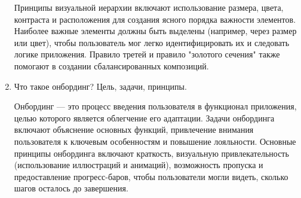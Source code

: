 \begin{enumerate}
    Принципы визуальной иерархии включают использование размера, цвета, контраста и расположения для создания ясного порядка важности элементов. Наиболее важные элементы должны быть выделены (например, через размер или цвет), чтобы пользователь мог легко идентифицировать их и следовать логике приложения. Правило третей и правило "золотого сечения" также помогают в создании сбалансированных композиций.

    \item Что такое онбординг? Цель, задачи, принципы.

    Онбординг — это процесс введения пользователя в функционал приложения, целью которого является облегчение его адаптации. Задачи онбординга включают объяснение основных функций, привлечение внимания пользователя к ключевым особенностям и повышение лояльности. Основные принципы онбординга включают краткость, визуальную привлекательность (использование иллюстраций и анимаций), возможность пропуска и предоставление прогресс-баров, чтобы пользователи могли видеть, сколько шагов осталось до завершения.
\end{enumerate}


